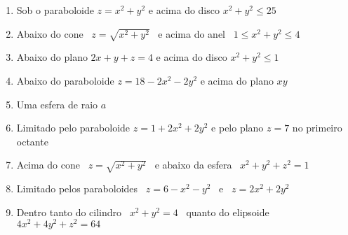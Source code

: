 	\begin{enumerate}[resume]
	
		\item Sob o paraboloide $z = x^2 + y^2$ e acima do disco $x^2 + y^2 \leq 25$
		
		\item Abaixo do cone \, $z = \sqrt{x^2 + y^2}$ \, e acima do anel \, $1 \leq x^2 + y^2 \leq 4$
		
		\item Abaixo do plano $2x + y + z = 4$ e acima do disco $x^2 + y^2 \leq 1$
		\resposta{$4\pi$}
		
		\item Abaixo do paraboloide $z = 18 - 2x^2 - 2y^2$ e acima do plano $xy$
		\resposta{$81\pi$}
		
		\item Uma esfera de raio $a$
		
		\item Limitado pelo paraboloide $z = 1 + 2x^2 + 2y^2$ e pelo plano $z = 7$ no primeiro octante \\
		
		\item Acima do cone \, $z = \sqrt{x^2 + y^2}$ \, e abaixo da esfera \, $x^2 + y^2 + z^2 = 1$
		
		\item Limitado pelos paraboloides \, $z = 6 - x^2 - y^2$ \, e \, $z = 2x^2 + 2y^2$
		\resposta{$6\pi$}
		
		\item Dentro tanto do cilindro \, $x^2 + y^2 = 4$ \, quanto do elipsoide \, $4x^2 + 4y^2 + z^2 = 64$ \\
	
	\end{enumerate}
			
	\vspace{5mm}	
	
	


